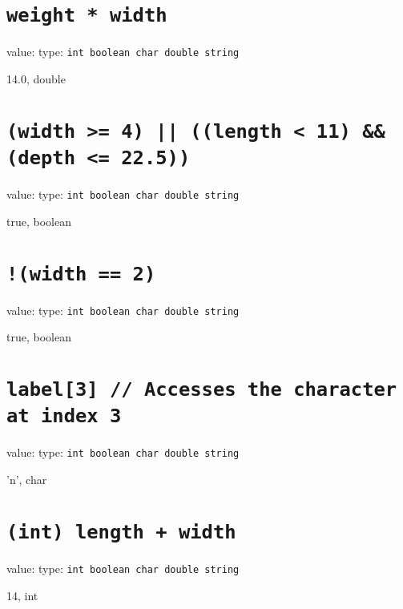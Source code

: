 \documentclass[11pt,answers]{exam}
\begin{document}
\begin{questions}
\begin{parts}
 \part[2] {\tt weight * width}
    \newline value: \makebox[2in]{\hrulefill} type: {\tt int   boolean   char    double   string}
    \newline	
	\begin{solution} 14.0, double \end{solution}

 \part[2] {\tt (width >= 4) || ((length < 11) \&\& (depth <= 22.5))}
    \newline value: \makebox[2in]{\hrulefill} type: {\tt int   boolean   char    double   string}
    \newline
	\begin{solution} true, boolean \end{solution}

 \part[2] {\tt !(width == 2)}
    \newline value: \makebox[2in]{\hrulefill} type: {\tt int   boolean   char    double   string}
    \newline
	\begin{solution} true, boolean \end{solution}
 
 \part[2] {\tt label[3] // Accesses the character at index 3}
    \newline value: \makebox[2in]{\hrulefill} type: {\tt int   boolean   char    double   string}
    \newline
	\begin{solution} 'n', char \end{solution}
		
 \part[2] {\tt (int) length + width} 	
    \newline value: \makebox[2in]{\hrulefill} type: {\tt int   boolean   char    double   string}
    \newline
	\begin{solution} 14, int \end{solution}
		

\end{parts}
\end{questions}
\end{document}
